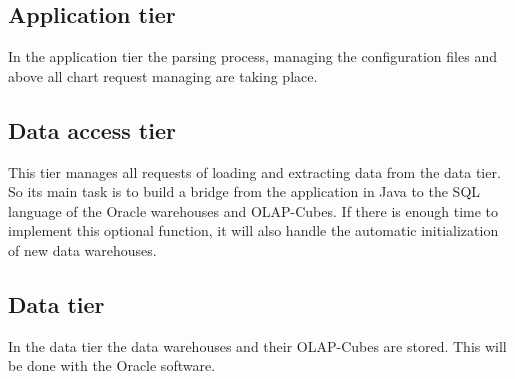 \subsection{Application tier}
In the application tier the parsing process, managing the configuration files and above all 
chart request managing are taking place. 

\subsection{Data access tier}
This tier manages all requests of loading and extracting data from the data tier. So its main task is
to build a bridge from the application in Java to the SQL language of the Oracle warehouses and OLAP-Cubes.
If there is enough time to implement this optional function, it will also handle 
the automatic initialization of new data warehouses.  

\subsection{Data tier}
In the data tier the data warehouses and their OLAP-Cubes are stored. 
This will be done with the Oracle software.  
